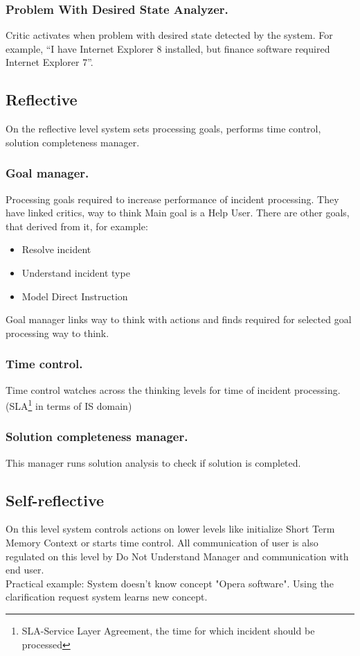 \documentclass[runningheads,a4paper]{llncs}
\begin{document}
\subsubsection{Problem With Desired State Analyzer.} Critic activates when problem with desired state detected by the system. For example, “I have Internet Explorer 8 installed, but finance software required Internet Explorer 7”.

\subsection{Reflective}

On the reflective level system sets processing goals, performs time control, solution completeness manager.

\subsubsection{Goal manager.} Processing goals required to increase performance of incident processing. They have linked critics, way to think Main goal is a Help User. There are other goals, that derived from it, for example:
\begin{itemize}
 \item Resolve incident
 \item Understand incident type
 \item Model Direct Instruction
\end{itemize}
Goal manager links way to think with actions and finds required for selected goal processing way to think.

\subsubsection{Time control.} Time control watches across the thinking levels for time of incident processing. (SLA\footnote{SLA-Service Layer Agreement, the time for which incident should be processed} in terms of IS domain)

\subsubsection{Solution completeness manager.} This manager runs solution analysis to check if solution is completed.

\subsection{Self-reflective}
On this level system controls actions on lower levels like initialize Short Term Memory Context or starts time control. All communication of user is also regulated on this level by Do Not Understand Manager and communication with end user.\\
Practical example: System doesn't know concept "Opera software". Using the clarification request system learns new concept.
\end{document}
